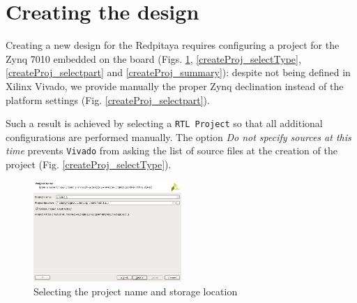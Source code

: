 \documentclass[10pt,oneside]{article}
\begin{document}
%



\section{Creating the design}

Creating a new design for the Redpitaya requires configuring a project for
the Zynq 7010 embedded on the board (Figs. \ref{createProj1}, \ref{createProj_selectType}, 
\ref{createProj_selectpart} and \ref{createProj_summary}): despite not being 
defined in Xilinx Vivado, we provide manually the proper Zynq declination
instead of the platform settings (Fig. \ref{createProj_selectpart}).

Such a result is achieved by selecting a {\tt RTL Project} so that all additional
configurations are performed manually. The option {\em Do not specify sources at this time} 
prevents {\tt Vivado} from asking the list of source files at the creation of the project
(Fig. \ref{createProj_selectType}).

\begin{figure}[h!tb]
\begin{center}
\includegraphics[width=0.5\textwidth]{./createProj1.png}
\end{center}
\caption{Selecting the project name and storage location}
\label{createProj1}
\end{figure}
\end{document}
